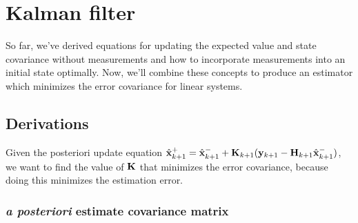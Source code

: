 \section{Kalman filter}

So far, we've derived equations for updating the expected value and state
covariance without measurements and how to incorporate measurements into an
initial \gls{state} optimally. Now, we'll combine these concepts to produce an
estimator which minimizes the error covariance for linear \glspl{system}.

\subsection{Derivations}

Given the posteriori update equation $\hat{\mathbf{x}}_{k+1}^+ =
\hat{\mathbf{x}}_{k+1}^- + \mathbf{K}_{k+1}(\mathbf{y}_{k+1} -
\mathbf{H}_{k+1} \hat{\mathbf{x}}_{k+1}^-)$, we want to find the value of $\mathbf{K}$
that minimizes the error covariance, because doing this minimizes the estimation
error.

\subsubsection{\textit{a posteriori} estimate covariance matrix}

